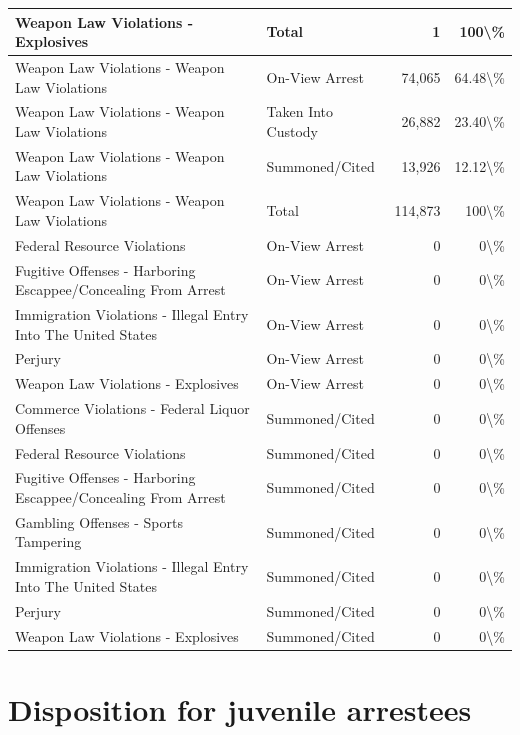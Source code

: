 \documentclass[
]{krantz}
\begin{document}
\begin{longtable}[t]{l|l|r|r}
\hline
Weapon Law Violations - Explosives & Total & 1 & 100\textbackslash{}\%\\
\hline
Weapon Law Violations - Weapon Law Violations & On-View Arrest & 74,065 & 64.48\textbackslash{}\%\\
\hline
Weapon Law Violations - Weapon Law Violations & Taken Into Custody & 26,882 & 23.40\textbackslash{}\%\\
\hline
Weapon Law Violations - Weapon Law Violations & Summoned/Cited & 13,926 & 12.12\textbackslash{}\%\\
\hline
Weapon Law Violations - Weapon Law Violations & Total & 114,873 & 100\textbackslash{}\%\\
\hline
Federal Resource Violations & On-View Arrest & 0 & 0\textbackslash{}\%\\
\hline
Fugitive Offenses - Harboring Escappee/Concealing From Arrest & On-View Arrest & 0 & 0\textbackslash{}\%\\
\hline
Immigration Violations - Illegal Entry Into The United States & On-View Arrest & 0 & 0\textbackslash{}\%\\
\hline
Perjury & On-View Arrest & 0 & 0\textbackslash{}\%\\
\hline
Weapon Law Violations - Explosives & On-View Arrest & 0 & 0\textbackslash{}\%\\
\hline
Commerce Violations - Federal Liquor Offenses & Summoned/Cited & 0 & 0\textbackslash{}\%\\
\hline
Federal Resource Violations & Summoned/Cited & 0 & 0\textbackslash{}\%\\
\hline
Fugitive Offenses - Harboring Escappee/Concealing From Arrest & Summoned/Cited & 0 & 0\textbackslash{}\%\\
\hline
Gambling Offenses - Sports Tampering & Summoned/Cited & 0 & 0\textbackslash{}\%\\
\hline
Immigration Violations - Illegal Entry Into The United States & Summoned/Cited & 0 & 0\textbackslash{}\%\\
\hline
Perjury & Summoned/Cited & 0 & 0\textbackslash{}\%\\
\hline
Weapon Law Violations - Explosives & Summoned/Cited & 0 & 0\textbackslash{}\%\\
\hline
\end{longtable}

\section{Disposition for juvenile
arrestees}\label{disposition-for-juvenile-arrestees}
\end{document}
